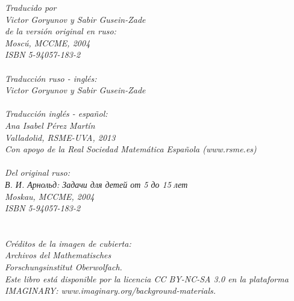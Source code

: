 \documentclass[12pt]{article}  %
\begin{document}
{\em
Traducido por \\
Victor Goryunov y Sabir Gusein-Zade \\
de la versi\'on original en ruso: \\
Mosc\'u, MCCME, 2004 \\
ISBN 5-94057-183-2\\
\\
Traducci\'on ruso - ingl\'es:\\
Victor Goryunov y Sabir Gusein-Zade\\
\\
Traducci\'on ingl\'es - espa\~{n}ol:\\
Ana Isabel P\'erez Mart\'in\\
Valladolid, RSME-UVA, 2013\\
Con apoyo de la Real Sociedad Matem\'atica Espa\~{n}ola (www.rsme.es)\\
\\
Del original ruso:\\
В. И. Арнольд: Задачи для детей от 5 до 15 лет\\
Moskau, MCCME, 2004\\
ISBN 5-94057-183-2\\
\\
\\
Cr\'editos de la imagen de cubierta:\\
Archivos del 
Mathematisches \\Forschungsinstitut Oberwolfach.
\\
Este libro est\'a disponible por la licencia CC BY-NC-SA 3.0 en la plataforma IMAGINARY: www.imaginary.org/background-materials.
}
\end{document}
